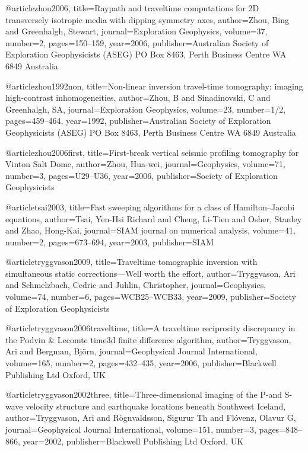 @article{zhou2006,
  title={Raypath and traveltime computations for 2D transversely isotropic media with dipping symmetry axes},
  author={Zhou, Bing and Greenhalgh, Stewart},
  journal={Exploration Geophysics},
  volume={37},
  number={2},
  pages={150--159},
  year={2006},
  publisher={Australian Society of Exploration Geophysicists (ASEG) PO Box 8463, Perth Business Centre WA 6849 Australia}
}

@article{zhou1992non,
  title={Non-linear inversion travel-time tomography: imaging high-contrast inhomogeneities},
  author={Zhou, B and Sinadinovski, C and Greenhalgh, SA},
  journal={Exploration Geophysics},
  volume={23},
  number={1/2},
  pages={459--464},
  year={1992},
  publisher={Australian Society of Exploration Geophysicists (ASEG) PO Box 8463, Perth Business Centre WA 6849 Australia}
}


@article{zhou2006first,
  title={First-break vertical seismic profiling tomography for Vinton Salt Dome},
  author={Zhou, Hua-wei},
  journal={Geophysics},
  volume={71},
  number={3},
  pages={U29--U36},
  year={2006},
  publisher={Society of Exploration Geophysicists}
}

@article{tsai2003,
  title={Fast sweeping algorithms for a class of Hamilton--Jacobi equations},
  author={Tsai, Yen-Hsi Richard and Cheng, Li-Tien and Osher, Stanley and Zhao, Hong-Kai},
  journal={SIAM journal on numerical analysis},
  volume={41},
  number={2},
  pages={673--694},
  year={2003},
  publisher={SIAM}
}

@article{tryggvason2009,
  title={Traveltime tomographic inversion with simultaneous static corrections—Well worth the effort},
  author={Tryggvason, Ari and Schmelzbach, Cedric and Juhlin, Christopher},
  journal={Geophysics},
  volume={74},
  number={6},
  pages={WCB25--WCB33},
  year={2009},
  publisher={Society of Exploration Geophysicists}
}

@article{tryggvason2006traveltime,
  title={A traveltime reciprocity discrepancy in the Podvin \& Lecomte time3d finite difference algorithm},
  author={Tryggvason, Ari and Bergman, Bj{\"o}rn},
  journal={Geophysical Journal International},
  volume={165},
  number={2},
  pages={432--435},
  year={2006},
  publisher={Blackwell Publishing Ltd Oxford, UK}
}

@article{tryggvason2002three,
  title={Three-dimensional imaging of the P-and S-wave velocity structure and earthquake locations beneath Southwest Iceland},
  author={Tryggvason, Ari and R{\"o}gnvaldsson, Sigur{\dh}ur Th and Fl{\'o}venz, Olavur G},
  journal={Geophysical Journal International},
  volume={151},
  number={3},
  pages={848--866},
  year={2002},
  publisher={Blackwell Publishing Ltd Oxford, UK}
}

